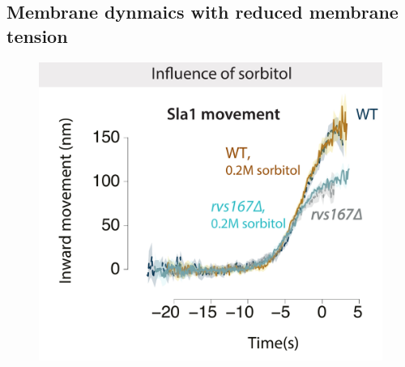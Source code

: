 	\subsection{Membrane dynmaics with reduced membrane tension}
	
	\begin{figure}
	\centering
	\includegraphics[width=12cm,height=12 cm,keepaspectratio]{figures/results_final/sorbitol}
	\end{figure}



